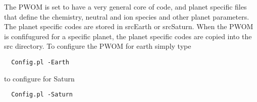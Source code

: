 The PWOM is set to have a very general core of code, and planet specific 
files that define the chemistry, neutral and ion species and other 
planet parameters. The planet specific codes are stored in srcEarth or 
srcSaturn. When the PWOM is confifugured for a specific planet, the planet 
specific codes are copied into the src directory. To configure the PWOM for 
earth simply type
\begin{verbatim}
  Config.pl -Earth
\end{verbatim}
to configure for Saturn
\begin{verbatim}
  Config.pl -Saturn
\end{verbatim}


